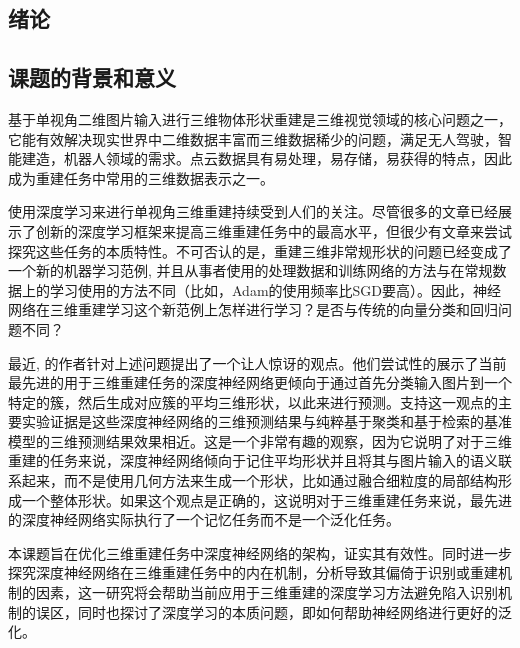 \documentclass[bachelor, nocolorlinks, printoneside]{seuthesis} %
\begin{document}
\begin{Main} %

\chapter{绪论}

\section{课题的背景和意义}
基于单视角二维图片输入进行三维物体形状重建是三维视觉领域的核心问题之一，它能有效解决现实世界中二维数据丰富而三维数据稀少的问题，满足无人驾驶，智能建造，机器人领域的需求。点云数据具有易处理，易存储，易获得的特点，因此成为重建任务中常用的三维数据表示之一。

使用深度学习来进行单视角三维重建持续受到人们的关注。尽管很多的文章已经展示了创新的深度学习框架来提高三维重建任务中的最高水平\cite{li2018point,park2019deepsdf,fan2017point,tatarchenko2017octree,groueix2018papier,yang2018foldingnet,wang2018pixel2mesh,sun2018pix3d,tulsiani2017multi,wu2017marrnet,yan2016perspective}，但很少有文章来尝试探究这些任务的本质特性。不可否认的是，重建三维非常规形状的问题已经变成了一个新的机器学习范例, 并且从事者使用的处理数据和训练网络的方法与在常规数据上的学习使用的方法不同（比如，Adam\cite{kingma2014adam}的使用频率比SGD要高）。因此，神经网络在三维重建学习这个新范例上怎样进行学习？是否与传统的向量分类和回归问题不同？

最近, \cite{tatarchenko2019single}的作者针对上述问题提出了一个让人惊讶的观点。他们尝试性的展示了当前最先进的用于三维重建任务的深度神经网络更倾向于通过首先分类输入图片到一个特定的簇，然后生成对应簇的平均三维形状，以此来进行预测。支持这一观点的主要实验证据是这些深度神经网络的三维预测结果与纯粹基于聚类和基于检索的基准模型的三维预测结果效果相近。这是一个非常有趣的观察，因为它说明了对于三维重建的任务来说，深度神经网络倾向于记住平均形状并且将其与图片输入的语义联系起来，而不是使用几何方法来生成一个形状，比如通过融合细粒度的局部结构形成一个整体形状。如果这个观点是正确的，这说明对于三维重建任务来说，最先进的深度神经网络实际执行了一个记忆任务而不是一个泛化任务\cite{arpit2017closer}。

本课题旨在优化三维重建任务中深度神经网络的架构，证实其有效性。同时进一步探究深度神经网络在三维重建任务中的内在机制，分析导致其偏倚于识别或重建机制的因素，这一研究将会帮助当前应用于三维重建的深度学习方法避免陷入识别机制的误区，同时也探讨了深度学习的本质问题，即如何帮助神经网络进行更好的泛化。


\end{Main}
\end{document}
